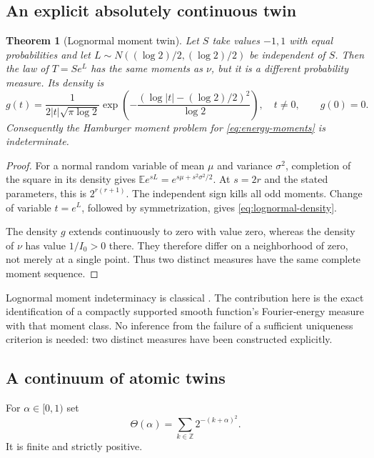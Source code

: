 \documentclass[11pt,a4paper]{article}
\numberwithin{equation}{section}
\newtheorem{theorem}{Theorem}[section]
\theoremstyle{definition}
\newcommand{\Z}{\mathbb Z}
\newcommand{\E}{\mathbb E}
\begin{document}
\subsection{An explicit absolutely continuous twin}

\begin{theorem}[Lognormal moment twin]\label{thm:lognormal}
Let $S$ take values $-1,1$ with equal probabilities and let
$L\sim N((\log2)/2,(\log2)/2)$ be independent of $S$. Then the
law of $T=S e^L$ has the same moments as $\nu$, but it is a
different probability measure. Its density is
\begin{equation}
 g(t)=\frac1{2|t|\sqrt{\pi\log2}}
       \exp\left(-\frac{(\log|t|-(\log2)/2)^2}{\log2}\right),
 \quad t\ne0,
 \qquad g(0)=0.
 \label{eq:lognormal-density}
\end{equation}
Consequently the Hamburger moment problem for
\eqref{eq:energy-moments} is indeterminate.
\end{theorem}
\begin{proof}
For a normal random variable of mean $\mu$ and variance $\sigma^2$,
completion of the square in its density gives
$\E e^{sL}=e^{s\mu+s^2\sigma^2/2}$. At $s=2r$ and the stated
parameters, this is $2^{r(r+1)}$. The independent sign kills all
odd moments. Change of variable $t=e^L$, followed by symmetrization,
gives \eqref{eq:lognormal-density}.

The density $g$ extends continuously to zero with value zero,
whereas the density of $\nu$ has value $1/I_0>0$ there. They
therefore differ on a neighborhood of zero, not merely at a single
point. Thus two distinct measures have the same complete moment
sequence.
\end{proof}

Lognormal moment indeterminacy is classical \cite{heyde}. The
contribution here is the exact identification of a compactly
supported smooth function's Fourier-energy measure with that
moment class. No inference from the failure of a sufficient
uniqueness criterion is needed: two distinct measures have been
constructed explicitly.

\subsection{A continuum of atomic twins}

For $\alpha\in[0,1)$ set
\begin{equation}
 \Theta(\alpha)=\sum_{k\in\Z}2^{-(k+\alpha)^2}.
 \label{eq:theta}
\end{equation}
It is finite and strictly positive.
\end{document}
